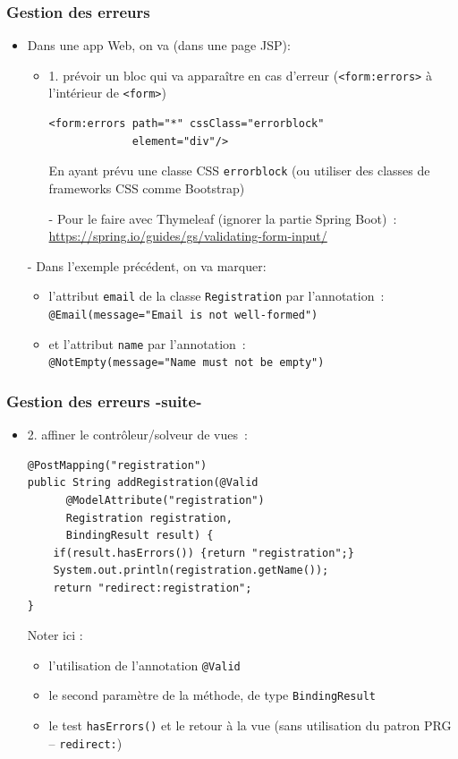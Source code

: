 \documentclass{beamer}
\begin{document}
\begin{frame}[fragile]
	\frametitle{Gestion des erreurs}
	\begin{itemize}
		\item Dans une app Web, on va (dans une page JSP):
		\begin{itemize}
			\item 1. prévoir un bloc qui va apparaître en cas d'erreur (\texttt{<form:errors>} à l'intérieur de \texttt{<form>})
\begin{lstlisting}
<form:errors path="*" cssClass="errorblock" 
             element="div"/>
\end{lstlisting}
			En ayant prévu une classe CSS \texttt{errorblock} (ou utiliser des classes de frameworks CSS comme Bootstrap)
			\item[-] Pour le faire avec Thymeleaf (ignorer la partie Spring Boot)~:\\
			\footnotesize
			\url{https://spring.io/guides/gs/validating-form-input/}
			\normalsize
		\end{itemize}
		\item[-]Dans l'exemple précédent, on va marquer:
		\begin{itemize}
			\item l'attribut \texttt{email} de la classe \texttt{Registration} par l'annotation~:\\ \texttt{@Email(message="Email is not well-formed")}
			\item et l'attribut \texttt{name} par l'annotation~:\\
			\texttt{@NotEmpty(message="Name must not be empty")}
		\end{itemize}
	\end{itemize}
\end{frame}

\begin{frame}[fragile]
	\frametitle{Gestion des erreurs -suite-}
		\begin{itemize}
			\item 2. affiner le contrôleur/solveur de vues~:
		
\begin{lstlisting}
@PostMapping("registration")
public String addRegistration(@Valid 
      @ModelAttribute("registration") 
      Registration registration,
      BindingResult result) {
	if(result.hasErrors()) {return "registration";}
	System.out.println(registration.getName());
	return "redirect:registration";
}
\end{lstlisting}
		
		Noter ici :
		\begin{itemize}
			\item l'utilisation de l'annotation \texttt{@Valid}
			\item le second paramètre de la méthode, de type \texttt{BindingResult}
			\item le test \texttt{hasErrors()} et le retour à la vue (sans utilisation du patron PRG -- \texttt{redirect:})
		\end{itemize}
	\end{itemize}
\end{frame} 
\end{document}
